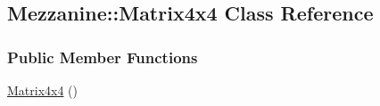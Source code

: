 \hypertarget{classMezzanine_1_1Matrix4x4}{
\subsection{Mezzanine::Matrix4x4 Class Reference}
\label{classMezzanine_1_1Matrix4x4}
}
\subsubsection*{Public Member Functions}
\begin{DoxyCompactItemize}
\item 
\hypertarget{classMezzanine_1_1Matrix4x4_a529aa6f03eccc97eb14ebbd20e599588}{
\hyperlink{classMezzanine_1_1Matrix4x4_a529aa6f03eccc97eb14ebbd20e599588}{Matrix4x4} ()}
\label{classMezzanine_1_1Matrix4x4_a529aa6f03eccc97eb14ebbd20e599588}


\end{DoxyCompactItemize}
